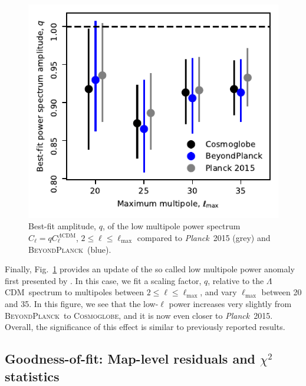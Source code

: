 \documentclass[twocolumn]{../../common/aa}
\def\planck{\emph{Planck}}
\def\Planck{\emph{Planck}}
\def\LCDM{$\Lambda$CDM}
\newcommand{\bp}{\textsc{BeyondPlanck}}
\newcommand{\cosmoglobe}{\textsc{Cosmoglobe}}
\begin{document}
\begin{figure}
	\includegraphics[width=\columnwidth]{figures/WMAP_best_q_fit.pdf}
	\caption{Best-fit amplitude, $q$, of the low multipole power spectrum $C_{\ell} = q C^{\Lambda \mathrm{CDM}}_{\ell}$, $2 \leq \ell \leq \ell_{\mathrm{max}}$ compared to \planck\ 2015 (grey) and \bp\ (blue).}
        \label{fig:lowl}
\end{figure}

Finally, Fig.~\ref{fig:lowl} provides an update of the so called low multipole power anomaly first presented by \citet{planck2014-a13}. In this case, we fit a scaling factor, $q$, relative to the \LCDM\ spectrum to multipoles between $2\le\ell\le\ell_{\mathrm{max}}$, and vary $\ell_{\mathrm{max}}$ between 20 and 35. In this figure, we see that the low-$\ell$ power increases very slightly from \bp\ to \cosmoglobe, and it is now even closer to \Planck\ 2015. Overall, the significance of this effect is similar to previously reported results.



\subsection{Goodness-of-fit: Map-level residuals and $\chi^2$ statistics}\label{subsub:compsep_chisq}
\end{document}
